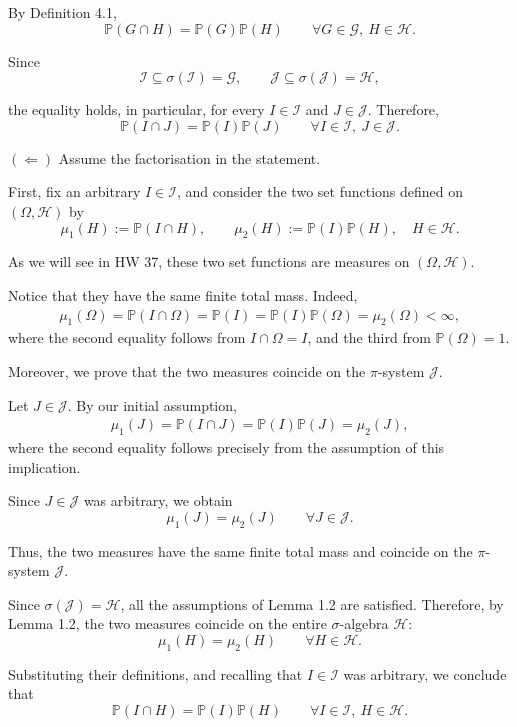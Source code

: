 \documentclass[11pt,a4paper]{article}
\newcommand{\studyheading}[1]{{\color{StudyBlue}\normalfont\bfseries\boldmath #1}}
\begin{document}
By Definition 4.1,
\[
\mathbb P(G\cap H)=\mathbb P(G)\mathbb P(H)
\qquad
\forall G\in\mathcal G,\ H\in\mathcal H.
\]

Since
\[
\mathcal I\subseteq\sigma(\mathcal I)=\mathcal G,
\qquad
\mathcal J\subseteq\sigma(\mathcal J)=\mathcal H,
\]

the equality holds, in particular, for every $I\in\mathcal I$ and $J\in\mathcal J$. Therefore,
\[
\mathbb P(I\cap J)=\mathbb P(I)\mathbb P(J)
\qquad\forall I\in\mathcal I,\ J\in\mathcal J.
\]

\studyheading{$(\Leftarrow)$} Assume the factorisation in the statement.

First, fix an arbitrary $I\in\mathcal I$, and consider the two set functions defined on $(\Omega,\mathcal H)$ by
\[
\mu_1(H):=\mathbb P(I\cap H),
\qquad
\mu_2(H):=\mathbb P(I)\mathbb P(H),
\quad H\in\mathcal H.
\]

As we will see in HW 37, these two set functions are measures on $(\Omega,\mathcal H)$.

Notice that they have the same finite total mass. Indeed,
\[
\begin{aligned}
\mu_1(\Omega)
=\mathbb P(I\cap\Omega) =\mathbb P(I) =\mathbb P(I)\mathbb P(\Omega) =\mu_2(\Omega)<\infty,
\end{aligned}
\]
where the second equality follows from $I\cap\Omega=I$, and the third from $\mathbb P(\Omega)=1$.

Moreover, we prove that the two measures coincide on the $\pi$-system $\mathcal J$.

Let $J\in\mathcal J$. By our initial assumption,
\[
\begin{aligned}
\mu_1(J)
=\mathbb P(I\cap J) =\mathbb P(I)\mathbb P(J) =\mu_2(J),
\end{aligned}
\]
where the second equality follows precisely from the assumption of this implication.

Since $J\in\mathcal J$ was arbitrary, we obtain
\[
\mu_1(J)=\mu_2(J)
\qquad\forall J\in\mathcal J.
\]

Thus, the two measures have the same finite total mass and coincide on the $\pi$-system $\mathcal J$.

Since $\sigma(\mathcal J)=\mathcal H$, all the assumptions of Lemma 1.2 are satisfied. Therefore, by Lemma 1.2, the two measures coincide on the entire $\sigma$-algebra $\mathcal H$:
\[
\mu_1(H)=\mu_2(H)
\qquad\forall H\in\mathcal H.
\]

Substituting their definitions, and recalling that $I\in\mathcal I$ was arbitrary, we conclude that
\[
\mathbb P(I\cap H)=\mathbb P(I)\mathbb P(H)
\qquad
\forall I\in\mathcal I,\ H\in\mathcal H.
\]
\end{document}
